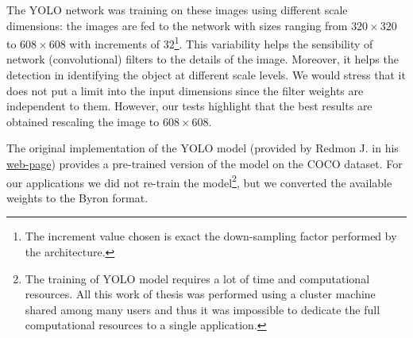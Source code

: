 \documentclass{standalone}
\begin{document}
The YOLO network was training on these images using different scale dimensions: the images are fed to the network with sizes ranging from $320\times320$ to $608\times608$ with increments of $32$\footnote{
  The increment value chosen is exact the down-sampling factor performed by the architecture.
}.
This variability helps the sensibility of network (convolutional) filters to the details of the image.
Moreover, it helps the detection in identifying the object at different scale levels.
We would stress that it does not put a limit into the input dimensions since the filter weights are independent to them.
However, our tests highlight that the best results are obtained rescaling the image to $608\times608$.

The original implementation of the YOLO model (provided by Redmon J. in his \href{https://pjreddie.com/darknet/yolo}{web-page}) provides a pre-trained version of the model on the COCO dataset.
For our applications we did not re-train the model\footnote{
  The training of YOLO model requires a lot of time and computational resources.
  All this work of thesis was performed using a cluster machine shared among many users and thus it was impossible to dedicate the full computational resources to a single application.
}, but we converted the available weights to the \textsf{Byron} format.
\end{document}
